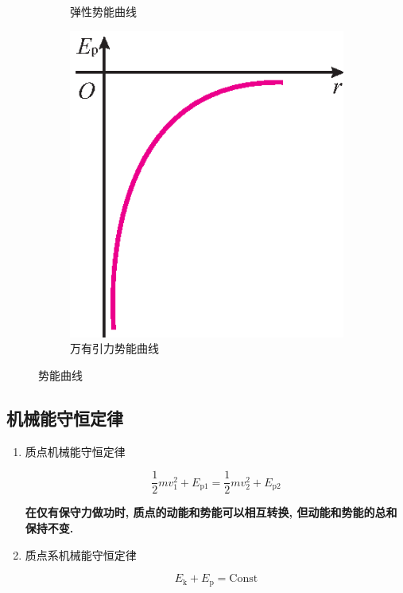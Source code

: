 \begin{figure}[H]
\begin{subfigure}[t]{0.4\textwidth}
		\caption{弹性势能曲线}
		\label{C3-kbfig3.3}
	\end{subfigure}
	\begin{subfigure}[t]{0.4\textwidth}
		\centering
		\includegraphics[width=\textwidth]{C3-kbfig3.2.eps}
		\caption{万有引力势能曲线}
		\label{C3-kbfig3.2}
	\end{subfigure}
	\caption{势能曲线}
\end{figure}

\subsection{机械能守恒定律}

\begin{enumerate}
	
	\item 质点机械能守恒定律
	
	\begin{equation}
		\dfrac{1}{2} m v_1^2 + E_{\mathrm{p1}} = \dfrac{1}{2} m v_2^2 + E_{\mathrm{p2}} \label{C3-eq21}
	\end{equation}
	
	\textbf{在仅有保守力做功时, 质点的动能和势能可以相互转换, 但动能和势能的总和保持不变. }
	
	\item 质点系机械能守恒定律
	
	\begin{equation}
		E_{\mathrm{k}} + E_{\mathrm{p}} = \text{Const} \label{C3-eq22}
	\end{equation}
	
\end{enumerate}

